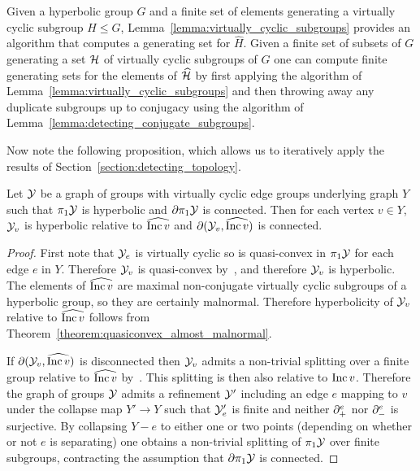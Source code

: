 \begin{remark}
  Given a hyperbolic group $G$ and a finite set of elements generating a virtually cyclic subgroup $H \leq G$, Lemma~\ref{lemma:virtually_cyclic_subgroups} provides an algorithm that computes a generating set for $\widehat{H}$.
  Given a finite set of subsets of $G$ generating a set $\mathcal{H}$ of virtually cyclic subgroups of $G$ one can compute finite generating sets for the elements of $\widehat{\mathcal{H}}$ by first applying the algorithm of Lemma~\ref{lemma:virtually_cyclic_subgroups} and then throwing away any duplicate subgroups up to conjugacy using the algorithm of Lemma~\ref{lemma:detecting_conjugate_subgroups}.
\end{remark}

Now note the following proposition, which allows us to iteratively apply the results of Section~\ref{section:detecting_topology}.

\begin{proposition}
  Let $\mathcal{Y}$ be a graph of groups with virtually cyclic edge groups underlying graph $Y$ such that $\pi_1\mathcal{Y}$ is hyperbolic and $\partial\pi_1\mathcal{Y}$ is connected.
  Then for each vertex $v \in Y$, $\mathcal{Y}_v$ is hyperbolic relative to $\widehat{\operatorname{\mathrm{Inc}} v}$ and $\partial(\mathcal{Y}_v, \widehat{\operatorname{\mathrm{Inc}} v})$ is connected.
\end{proposition}

\begin{proof}
    First note that $\mathcal{Y}_e$ is virtually cyclic so is quasi-convex in $\pi_1\mathcal{Y}$ for each edge $e$ in $Y$.
    Therefore $\mathcal{Y}_v$ is quasi-convex by~\cite[Proposition 1.2]{bowditch98}, and therefore $\mathcal{Y}_v$ is hyperbolic. 
    The elements of $\widehat{\operatorname{\mathrm{Inc}} v}$ are maximal non-conjugate virtually cyclic subgroups of a hyperbolic group, so they are certainly malnormal.
    Therefore hyperbolicity of $\mathcal{Y}_v$ relative to $\widehat{\operatorname{\mathrm{Inc}} v}$ follows from Theorem~\ref{theorem:quasiconvex_almost_malnormal}.

    If $\partial(\mathcal{Y}_v, \widehat{\operatorname{\mathrm{Inc}} v})$ is disconnected then $\mathcal{Y}_v$ admits a non-trivial splitting over a finite group relative to $\widehat{\operatorname{\mathrm{Inc}} v}$ by~\cite[Proposition 10.1]{bowditch12}.
    This splitting is then also relative to $\operatorname{\mathrm{Inc}} v$.
    Therefore the graph of groups $\mathcal{Y}$ admits a refinement $\mathcal{Y}'$ including an edge $e$ mapping to $v$ under the collapse map $Y' \to Y$ such that $\mathcal{Y}'_e$ is finite and neither $\partial^e_{+}$ nor $\partial^e_{-}$ is surjective. 
    By collapsing $Y - e$ to either one or two points (depending on whether or not $e$ is separating) one obtains a non-trivial splitting of $\pi_1\mathcal{Y}$ over finite subgroups, contracting the assumption that $\partial\pi_1\mathcal{Y}$ is connected.
\end{proof}

